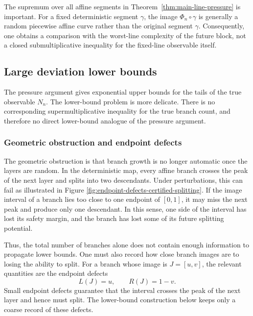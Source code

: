 \documentclass[11pt]{amsart}
\numberwithin{equation}{section}
\theoremstyle{plain}
\theoremstyle{definition}
\theoremstyle{remark}
\begin{document}
The supremum over all affine segments in Theorem~\ref{thm:main-line-pressure} is important. For a fixed deterministic segment \(\gamma\), the image \(\Phi_n\circ\gamma\) is generally a random piecewise affine curve rather than the original segment \(\gamma\). Consequently, one obtains a comparison with the worst-line complexity of the future block, not a closed submultiplicative inequality for the fixed-line observable itself.


\subsection{Large deviation lower bounds}\label{subsec:ldp-lower}

The pressure argument gives exponential upper bounds for the tails of the true observable \(N_n\). 
The lower-bound problem is more delicate. There is no corresponding supermultiplicative inequality for the true branch count, and therefore no direct lower-bound analogue of the pressure argument.


\subsubsection{Geometric obstruction and endpoint defects}


The geometric obstruction is that branch growth is no longer automatic once the layers are random. In the deterministic map, every affine branch crosses the peak of the next layer and splits into two descendants. Under perturbations, this can fail as illustrated in Figure \ref{fig:endpoint-defects-certified-splitting}. If the image interval of a branch lies too close to one endpoint of \([0,1]\), it may miss the next peak and produce only one descendant. In this sense, one side of the interval has lost its safety margin, and the branch has lost some of its future splitting potential.

Thus, the total number of branches alone does not contain enough information to propagate lower bounds. One must also record how close branch images are to losing the ability to split. For a branch whose image is \(J=[u,v]\), the relevant quantities are the endpoint defects
\[
L(J)=u,
\qquad
R(J)=1-v.
\]
Small endpoint defects guarantee that the interval crosses the peak of the next layer and hence must split. The lower-bound construction below keeps only a coarse record of these defects. 
\end{document}
